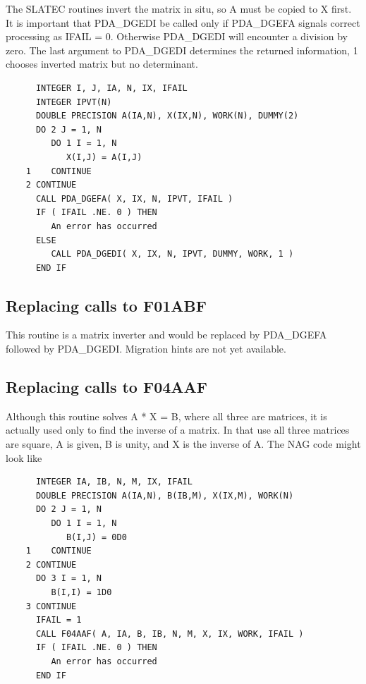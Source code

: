 \documentclass[11pt,twoside]{article}
\newcommand{\htmlref}[2]{#1}
\newcommand{\xlabel}[1]{}
\begin{document}
   The SLATEC routines invert the matrix in situ, so A must be copied to
   X first. It is important that PDA\_DGEDI be called only if PDA\_DGEFA
   signals correct processing as IFAIL = 0. Otherwise PDA\_DGEDI will
   encounter a division by zero. The last argument to PDA\_DGEDI
   determines the returned information, 1 chooses inverted matrix but no
   determinant.

\begin{verbatim}
      INTEGER I, J, IA, N, IX, IFAIL
      INTEGER IPVT(N)
      DOUBLE PRECISION A(IA,N), X(IX,N), WORK(N), DUMMY(2)
      DO 2 J = 1, N
         DO 1 I = 1, N
            X(I,J) = A(I,J)
    1    CONTINUE
    2 CONTINUE
      CALL PDA_DGEFA( X, IX, N, IPVT, IFAIL )
      IF ( IFAIL .NE. 0 ) THEN
         An error has occurred
      ELSE
         CALL PDA_DGEDI( X, IX, N, IPVT, DUMMY, WORK, 1 )
      END IF
\end{verbatim}


\subsection{\xlabel{replacing_calls_to_f01abf}Replacing calls to F01ABF}

   This routine is a matrix inverter and would be replaced
   by
\htmlref{PDA\_DGEFA}{PDA\_DGEFA}
   followed by
\htmlref{PDA\_\-DGEDI.}{PDA\_DGEDI}
   Migration hints are not yet available.


\subsection{\xlabel{replacing_calls_to_f04aaf}Replacing calls to F04AAF}

   Although this routine solves A * X = B, where all three are matrices,
   it is actually used only to find the inverse of a matrix. In that use
   all three matrices are square, A is given, B is unity, and X is the
   inverse of A. The NAG code might look like

\begin{verbatim}
      INTEGER IA, IB, N, M, IX, IFAIL
      DOUBLE PRECISION A(IA,N), B(IB,M), X(IX,M), WORK(N)
      DO 2 J = 1, N
         DO 1 I = 1, N
            B(I,J) = 0D0
    1    CONTINUE
    2 CONTINUE
      DO 3 I = 1, N
         B(I,I) = 1D0
    3 CONTINUE
      IFAIL = 1
      CALL F04AAF( A, IA, B, IB, N, M, X, IX, WORK, IFAIL )
      IF ( IFAIL .NE. 0 ) THEN
         An error has occurred
      END IF
\end{verbatim}
\end{document}
